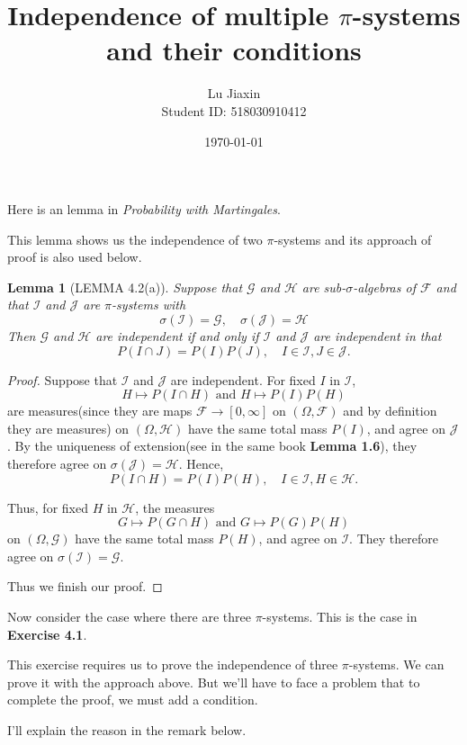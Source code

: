 \documentclass{article}
\title{Independence of multiple $\pi$-systems and their conditions}
\author{Lu Jiaxin\\
Student ID: 518030910412}
\date{\today}
\newtheorem{lemma}[theorem]{Lemma}
\newcommand{\mcf}{\mathcal{F}}
\newcommand{\mcg}{\mathcal{G}}
\newcommand{\mch}{\mathcal{H}}
\newcommand{\mci}{\mathcal{I}}
\newcommand{\mcj}{\mathcal{J}}
\newcommand{\AND}{\mbox{ and }}
\begin{document}
    \maketitle

Here is an lemma in \textit{Probability with Martingales}.

This lemma shows us the independence of two $\pi$-systems and its approach of proof is also used below.

\begin{tcolorbox}
\begin{lemma}[LEMMA 4.2(a)]\label{lemma4.2}
    Suppose that $\mcg$ and $\mch$ are sub-$\sigma$-algebras of $\mcf$ and that $\mci$ and $\mcj$ are $\pi$-systems with
    \[
        \sigma(\mci) = \mcg, \quad \sigma(\mcj) = \mch
    \]
    Then $\mcg$ and $\mch$ are independent if and only if $\mci$ and $\mcj$ are independent in that
    \[
        P(I\cap J) = P(I) P(J), \quad I\in\mci, J\in\mcj.        
    \]
\end{lemma}
\end{tcolorbox}

\begin{proof}
    Suppose that $\mci$ and $\mcj$ are independent. For fixed $I$ in $\mci$,
    \[
        H\mapsto P(I\cap H) \AND H\mapsto P(I)P(H)
    \]
    are measures(since they are maps $\mcf \to [0, \infty]$ on $(\Omega, \mcf)$ and by definition they are measures) on $(\Omega, \mch)$ have the same total mass $P(I)$, and agree on $\mcj$. By the uniqueness of extension(see in the same book \textbf{Lemma 1.6}), they therefore agree on $\sigma(\mcj) = \mch$. Hence,
    \[
        P(I\cap H) = P(I) P(H), \quad I\in\mci, H\in\mch.
    \]
    
    Thus, for fixed $H$ in $\mch$, the measures
    \[
        G\mapsto P(G\cap H) \AND G\mapsto P(G)P(H)
    \]
    on $(\Omega, \mcg)$ have the same total mass $P(H)$, and agree on $\mci$. They therefore agree on $\sigma(\mci) = \mcg$.
    
    Thus we finish our proof.
\end{proof}


Now consider the case where there are three $\pi$-systems. This is the case in \textbf{Exercise 4.1}.

This exercise requires us to prove the independence of three $\pi$-systems. We can prove it with the approach above. But we'll have to face a problem that to complete the proof, we must add a condition.

I'll explain the reason in the remark below.
\end{document}
